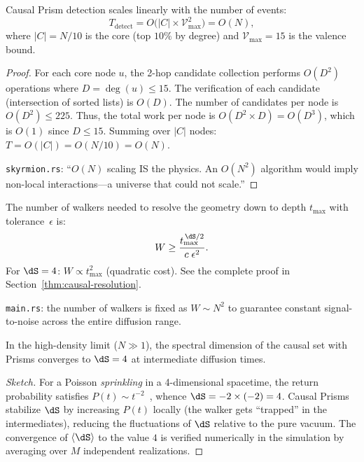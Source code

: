 \begin{theorem}
\label{thm:app-on}
Causal Prism detection scales linearly with the
number of events:
\begin{equation}
  T_{\text{detect}}
  = O\bigl(|C| \times \mathcal{V}_{\max}^2\bigr)
  = O(N),
  \label{eq:thm-on}
\end{equation}
where $|C| = N/10$ is the core (top $10\%$ by degree) and
$\mathcal{V}_{\max} = 15$ is the valence bound.
\end{theorem}

\begin{proof}
For each core node $u$, the 2-hop candidate collection
performs $O(D^2)$ operations where $D = \deg(u) \leq 15$. The
verification of each candidate (intersection of sorted
lists) is $O(D)$. The number of candidates per node is
$O(D^2) \leq 225$. Thus, the total work per node is
$O(D^2 \times D) = O(D^3)$, which is $O(1)$ since
$D \leq 15$. Summing over $|C|$ nodes:
$T = O(|C|) = O(N/10) = O(N)$.

\medskip\noindent
\texttt{skyrmion.rs}: ``$O(N)$ scaling IS the physics.
An $O(N^2)$ algorithm would imply non-local interactions---a
universe that could not scale.''
\end{proof}

\begin{theorem}
\label{thm:app-resolution}
The number of walkers needed to resolve the geometry
down to depth $t_{\max}$ with tolerance~$\epsilon$ is:
\begin{equation}
  W \geq \frac{t_{\max}^{\,\dS/2}}{c\;\epsilon^2}.
\end{equation}
For $\dS = 4$: $W \propto t_{\max}^2$ (quadratic cost).
See the complete proof in
Section~\ref{thm:causal-resolution}.

\medskip\noindent
\texttt{main.rs}: the number of walkers is fixed as
$W \sim N^2$ to guarantee constant signal-to-noise across the entire
diffusion range.
\end{theorem}

\begin{theorem}
\label{thm:app-emergent-dim}
In the high-density limit ($N \gg 1$), the spectral
dimension of the causal set with Prisms converges to
$\dS = 4$ at intermediate diffusion times.
\end{theorem}

\begin{proof}[Sketch]
For a Poisson \emph{sprinkling} in a 4-dimensional
spacetime, the return probability satisfies
$P(t) \sim t^{-2}$~\cite{eichhorn2014}, whence $\dS = -2
\times (-2) = 4$. Causal Prisms stabilize $\dS$
by increasing $P(t)$ locally (the walker gets ``trapped''
in the intermediates), reducing the fluctuations of $\dS$
relative to the pure vacuum. The convergence of $\langle \dS \rangle$
to the value $4$ is verified numerically in the simulation
by averaging over $M$ independent realizations.
\end{proof}

